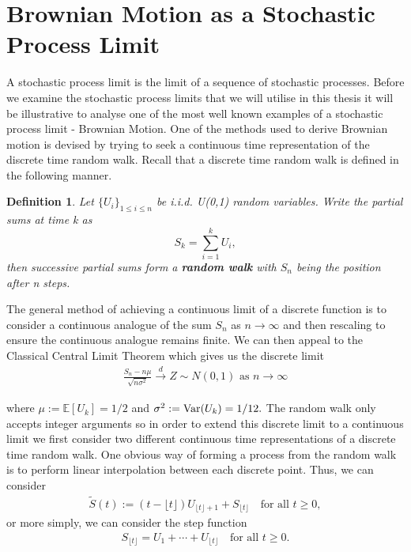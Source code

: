 \documentclass[honours,12pt]{UNSWthesis}
\newcommand{\E}{\mathbb{E}}
\newcommand{\1}{\mathbf 1}
\newcommand{\Var}{\mathop{\rm Var}}
\newtheorem{definition}[theorem]{Definition}
\numberwithin{equation}{section}
\theoremstyle{definition}
\theoremstyle{remark}
\begin{document}
\section{Brownian Motion as a Stochastic Process Limit}\label{s:background}
A stochastic process limit is the limit of a sequence of stochastic processes. Before we examine the stochastic process limits that we will utilise in this thesis it will be illustrative to analyse one of the most well known examples of a stochastic process limit - Brownian Motion. One of the methods used to derive Brownian motion is devised by trying to seek a continuous time representation of the discrete time random walk. Recall that a discrete time random walk is defined in the following manner.\\
\begin{definition}
Let $\{U_i\}_{1\leq i \leq n}$ be i.i.d. U(0,1) random variables. Write the partial sums at time k as
\[
	S_k=\sum_{i=1}^k U_i,
\]
then successive partial sums form a \textbf{random walk} with $S_n$ being the position after n steps.
\\
\end{definition}
\noindent The general method of achieving a continuous limit of a discrete function is to consider a continuous analogue of the sum $S_n$ as $n\to\infty$ and then rescaling to ensure the continuous analogue remains finite. We can then appeal to the Classical Central Limit Theorem which gives us the discrete limit
\begin{align}\label{eq:clt}
\frac{S_n-n\mu}{\sqrt{n\sigma^2}}\overset{d}{\longrightarrow}Z\sim N(0,1)\textrm{ as $n\to\infty$}
\end{align}

\noindent where $\mu:=\E[U_k]=1/2$ and $\sigma^2:=\Var(U_k)=1/12.$
The random walk only accepts integer arguments so in order to extend this discrete limit to a continuous limit we first consider two different continuous time representations of a discrete time random walk. One obvious way of forming a process from the random walk is to perform linear interpolation between each discrete point. Thus, we can consider
\begin{align}
	\tilde{S}(t):=(t-\lfloor t \rfloor)U_{\lfloor t \rfloor +1} + S_{\lfloor t \rfloor}\quad\textrm{for all } t\geq0,
\end{align}
or more simply, we can consider the step function
\begin{align}\label{fun:step}
	S_{\lfloor t \rfloor}=U_1+\cdots+U_{\lfloor t \rfloor}  \quad\textrm{for all } t\geq0.
\end{align}
\end{document}
